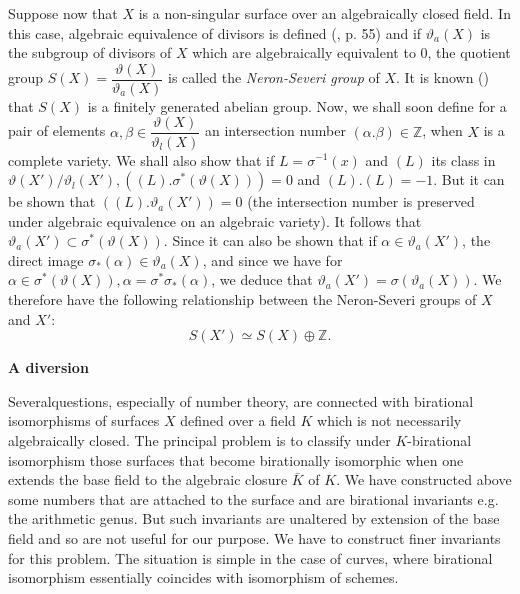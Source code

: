 Suppose now that $X$ is a non-singular surface over an algebraically
closed field. In this case, algebraic equivalence of divisors is
defined (\cite{key15}, p. 55) and if $\vartheta_a(X)$ is the subgroup of
divisors of $X$ which are algebraically equivalent to $0$, the
quotient group $S(X) = \dfrac{\vartheta(X)}{\vartheta_a(X)}$ is called
the \textit{ Neron-Severi group } of $X$. It is known (\cite{key16}) that
$S(X)$ is a finitely generated abelian group. Now, we shall soon
define for a pair of elements $\alpha, \beta \in
\dfrac{\vartheta(X)}{\vartheta_l(X)}$ an intersection number $(
\alpha. \beta ) \in \mathbb{Z}$, when $X$ is a complete variety. We
shall also show that if $L = \sigma^{-1}(x)$ and $(L)$  its class in
$\vartheta (X')/\vartheta_l (X'), ((L). \sigma^* (\vartheta(X))) = 0$
and $(L).(L)=-1$. But it can be shown that $((L). \vartheta_a(X'))=0$
(the intersection number is preserved under algebraic equivalence on
an algebraic variety). It follows that $\vartheta_a(X') \subset
\sigma^*(\vartheta(X))$. Since it can also be shown that if $\alpha
\in \vartheta_a(X')$, the direct image $\sigma_*(\alpha) \in
\vartheta_a(X)$, and since we have for $\alpha \in \sigma^*
(\vartheta(X)), \alpha = \sigma^* \sigma_* (\alpha)$, we deduce that
$\vartheta_a(X') = \sigma(\vartheta_a(X))$. We therefore have the
following relationship between the Neron-Severi groups of $X$ and
$X'$: 
$$
S(X') \simeq S(X) \oplus \mathbb{Z}.
$$


\noindent
\textbf{ A diversion }

Several\pageoriginale questions, especially of number theory, are connected with
birational isomorphisms of surfaces $X$ defined over a field $K$ which
is not necessarily algebraically closed. The principal problem is to
classify under $K$-birational isomorphism those surfaces that become
birationally isomorphic when one extends the base field to the
algebraic closure $\bar{K}$ of $K$. We have constructed above some
numbers that are attached to the surface and are birational invariants
e.g. the arithmetic genus. But such invariants are unaltered by
extension of the base field and so are not useful for our purpose. We
have to construct finer invariants for this problem. The situation is
simple in the case of curves, where birational isomorphism essentially
coincides with isomorphism of schemes. 

